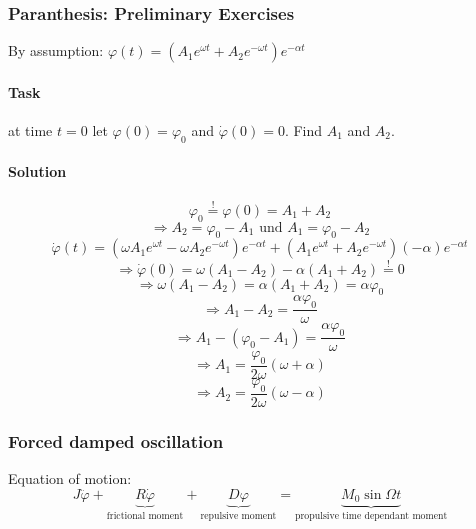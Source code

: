 \documentclass{scrreprt}
\renewcommand{\phi}{\varphi}
\begin{document}
\subsubsection{Paranthesis: Preliminary Exercises}
By assumption: $\varphi(t) = (A_1e^{\omega t} + A_2e^{-\omega t})e^{-\alpha t}$\\
\paragraph*{Task} at time $t=0$ let $\varphi(0) = \varphi_0$ and $\dot{\varphi}(0) = 0$. Find $A_1$ and $A_2$.\\
\paragraph*{Solution}
\begin{equation}
\varphi_0 \stackrel{!}= \varphi(0) = A_1 + A_2
\end{equation}
\begin{equation}
\Rightarrow A_2 = \varphi_0-A_1 \mbox{ und } A_1 = \varphi_0-A_2
\end{equation}
\begin{equation}
\dot{\varphi}(t) = (\omega A_1 e^{\omega t}-\omega A_2 e^{-\omega t})e^{-\alpha t} + (A_1e^{\omega t}+A_2e^{-\omega t})(-\alpha)e^{-\alpha t}
\end{equation}
\begin{equation}
\Rightarrow \dot{\varphi}(0) = \omega (A_1-A_2) - \alpha(A_1+A_2) \stackrel{!} = 0
\end{equation}
\begin{equation}
\Rightarrow \omega(A_1-A_2) = \alpha(A_1+A_2) = \alpha \varphi_0
\end{equation}
\begin{equation}
\Rightarrow A_1-A_2 = \frac{\alpha \varphi_0}{\omega}
\end{equation}
\begin{equation}
\Rightarrow A_1 -(\varphi_0-A_1) = \frac{\alpha \varphi_0}{\omega}
\end{equation}
\begin{equation}
\Rightarrow A_1=\frac{\varphi_0}{2 \omega} (\omega + \alpha)
\end{equation}
\begin{equation}
\Rightarrow A_2=\frac{\varphi_0}{2 \omega} (\omega - \alpha)
\end{equation}

\subsubsection{Forced damped oscillation}
Equation of motion:
\begin{equation}
J\ddot{\phi} + \underbrace{R \dot{\phi}}_{\text{frictional moment}} + \underbrace{D \phi}_{\text{repulsive moment}}  = \underbrace{M_0 \sin{\Omega t}}_{\text{propulsive time dependant moment}}
\end{equation}
\end{document}
